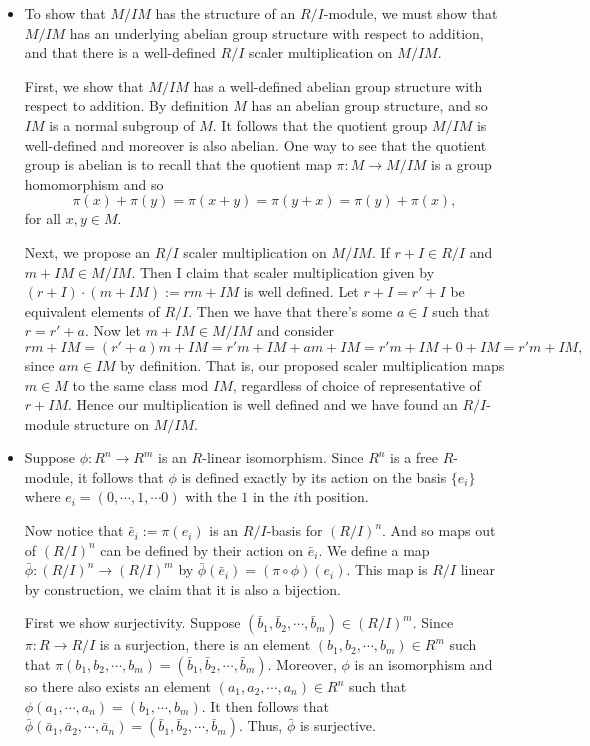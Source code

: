 \documentclass[12pt,letterpaper,boxed]{hmcpset}
\begin{document}
\begin{solution}
\begin{itemize}
\item To show that $M/IM$ has the structure of an $R/I$-module, we
must show that $M/IM$ has an underlying abelian group structure with
respect to addition, and that there is a well-defined $R/I$ scaler
multiplication on $M/IM$.

First, we show that $M/IM$ has a well-defined abelian group structure
with respect to addition. By definition $M$ has an abelian group
structure, and so $IM$ is a normal subgroup of $M$. It follows that
the quotient group $M/IM$ is well-defined and moreover is also
abelian. One way to see that the quotient group is abelian is to
recall that the quotient map $\pi: M \to M/IM$ is a group homomorphism
and so \[
\pi(x) + \pi(y) = \pi(x + y) = \pi(y + x) = \pi(y) + \pi(x),
\]
for all $x,y \in M$. 

Next, we propose an $R/I$ scaler multiplication on $M/IM$. If $r + I
\in R/I$ and $m + IM \in M/IM$. Then I claim that scaler multiplication given
by $(r+I) \cdot (m + IM) := rm + IM$ is well defined.
Let $r + I = r' + I$ be equivalent elements of $R/I$. Then we have
that there's some $a \in I$ such that $r = r' + a$. Now let $m + IM
\in M/IM$ and consider \[
rm + IM = (r' + a)m + IM = r'm + IM + am + IM = r'm + IM + 0 + IM =
r'm + IM,
\]
since $am \in IM$ by definition. That is, our proposed scaler
multiplication maps $m \in M$ to the same class mod $IM$, regardless
of choice of representative of $r + IM$. Hence our multiplication is
well defined and we have found an $R/I$-module structure on $M/IM$.

\item 
Suppose $\phi: R^n \to R^m$ is an $R$-linear isomorphism. Since $R^n$
is a free $R$-module, it follows that $\phi$ is defined exactly by its
action on the basis $\{e_i\}$ where $e_i = (0, \cdots, 1, \cdots 0)$
with the $1$ in the $i$th position.

Now notice that $\bar e_i := \pi(e_i)$ is an $R/I$-basis for
$(R/I)^n$. And so maps out of $(R/I)^n$ can be defined by their action
on $\bar e_i$. We define a map $\bar \phi: (R/I)^n \to (R/I)^m$ by
$\bar \phi(\bar e_i) = (\pi \circ \phi)(e_i)$. This map is $R/I$
linear by construction, we claim that it is also a bijection.

First we show surjectivity. 
Suppose $(\bar b_1, \bar b_2, \cdots, \bar b_m) \in (R/I)^m$. Since
$\pi: R \to R/I$ is a surjection, there is an element $(b_1, b_2,
\cdots, b_m) \in R^m$ such that $\pi(b_1, b_2, \cdots, b_m) = (\bar
b_1, \bar b_2, \cdots, \bar b_m)$. Moreover, $\phi$ is an isomorphism
and so there also exists an element $(a_1, a_2, \cdots, a_n) \in R^n$
such that $\phi(a_1, \cdots, a_n) = (b_1, \cdots, b_m)$. It then
follows that $\bar\phi(\bar a_1, \bar a_2, \cdots, \bar a_n) = (\bar
b_1, \bar b_2, \cdots, \bar b_m)$. Thus, $\bar \phi$ is surjective.


\end{itemize}
\end{solution}
\end{document}
